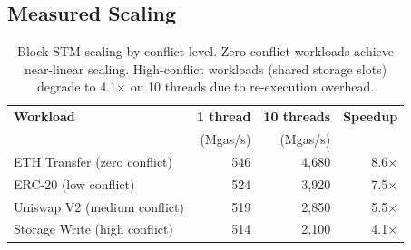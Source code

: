 \subsection{Measured Scaling}

\begin{table}[h]
\centering
\small
\begin{tabular}{lrrr}
\toprule
\textbf{Workload} & \textbf{1 thread} & \textbf{10 threads} & \textbf{Speedup} \\
                   & (Mgas/s)          & (Mgas/s)            & \\
\midrule
ETH Transfer (zero conflict)  & 546  & 4{,}680 & 8.6$\times$ \\
ERC-20 (low conflict)         & 524  & 3{,}920 & 7.5$\times$ \\
Uniswap V2 (medium conflict)  & 519  & 2{,}850 & 5.5$\times$ \\
Storage Write (high conflict)  & 514  & 2{,}100 & 4.1$\times$ \\
\bottomrule
\end{tabular}
\caption{Block-STM scaling by conflict level. Zero-conflict workloads achieve
near-linear scaling. High-conflict workloads (shared storage slots) degrade
to 4.1$\times$ on 10 threads due to re-execution overhead.}
\label{tab:blockstm}
\end{table}


